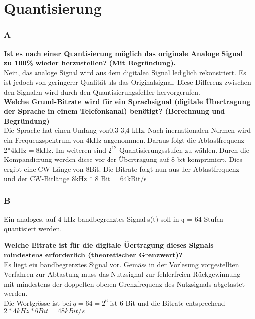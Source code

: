 

\section{Quantisierung}
\subsubsection{A}
\textbf{Ist es nach einer Quantisierung möglich das originale Analoge Signal zu 100\% wieder herzustellen? (Mit Begründung).}\\
Nein, das analoge Signal wird aus dem digitalen Signal lediglich rekonstriert. Es ist jedoch von geringerer Qualität als das Originalsignal. Diese Differenz zwischen den Signalen wird durch
den Quantisierungsfehler hervorgerufen.\\

\textbf{Welche Grund-Bitrate wird für ein Sprachsignal (digitale Übertragung der Sprache in einem Telefonkanal) benötigt? (Berechnung und Begründung)}\\
Die Sprache hat einen Umfang von0,3-3,4 kHz. Nach inernationalen Normen wird ein Frequenzspektrum von 4kHz angenommen. Daraus folgt die Abtastfrequenz 2*4kHz = 8kHz. Im weiteren sind $2^12$ Quantisierungsstufen zu wählen. Durch die Kompandierung werden diese vor der Übertragung auf 8 bit komprimiert. Dies ergibt eine CW-Länge von 8Bit. Die
Bitrate folgt nun aus der Abtastfrequenz und der CW-Bitlänge 8kHz * 8 Bit = 64kBit/s

\subsubsection{B}
Ein analoges, auf 4 kHz bandbegrenztes Signal s(t) soll in q = 64 Stufen quantisiert werden.

\textbf{Welche Bitrate ist für die digitale Üertragung dieses Signals mindestens erforderlich (theoretischer Grenzwert)?}\\
Es liegt ein bandbegrenztes Signal vor. Gemäss in der Vorlesung vorgestellten Verfahren zur Abtastung muss das Nutzsignal zur fehlerfreien Rückgewinnung mit mindestens der doppelten oberen Grenzfrequenz des Nutzsignals abgetastet werden.\\
Die Wortgrösse ist bei $q=64=2^6$ ist 6 Bit und die Bitrate entsprechend $2*4kHz*6Bit=48kBit/s$\\

